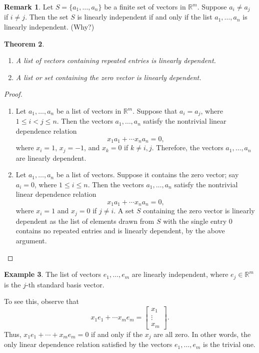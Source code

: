 \documentclass{amsart}
\newcommand{\RR}{\mathbb{R}}
\newtheorem{theorem}{Theorem}[section]
\theoremstyle{definition}
\newtheorem{remark}[theorem]{Remark}
\newtheorem{example}[theorem]{Example}
\begin{document}
\begin{remark}
Let $S=\{a_1,\ldots,a_n\}$ be a finite set of vectors in $\RR^m$.
Suppose $a_i\neq a_j$ if $i\neq j$.
Then the set $S$ is linearly independent if and only if the list $a_1,\ldots,a_n$ is linearly independent. (Why?)
\end{remark}

\begin{theorem}\hfill
\begin{enumerate}
  \item A list of vectors containing repeated entries is linearly dependent.
  \item A list or set containing the zero vector is linearly dependent.
\end{enumerate}
\end{theorem}

\begin{proof}\hfill
\begin{enumerate}
  \item Let $a_1,\ldots,a_n$ be a list of vectors in $\RR^m$.
  Suppose that $a_i=a_j$, where $1\leq i<j\leq n$.
  Then the vectors $a_1,\ldots,a_n$ satisfy the nontrivial linear dependence relation
  \[
  x_1a_1+\cdots x_na_n=0,
  \]
  where $x_i=1$, $x_j=-1$, and $x_k=0$ if $k\neq i,j$.
  Therefore, the vectors $a_1,\ldots,a_n$ are linearly dependent.

  \item Let $a_1,\ldots,a_n$ be a list of vectors.
  Suppose it contains the zero vector; say $a_i=0$, where $1\leq i\leq n$. 
  Then the vectors $a_1,\ldots,a_n$ satisfy the nontrivial linear dependence relation
  \[
  x_1a_1+\cdots x_na_n=0,
  \]
  where $x_i=1$ and $x_j=0$ if $j\neq i$.
  A set $S$ containing the zero vector is linearly dependent as the list of elements drawn from $S$ with the single entry $0$ contains no repeated entries and is linearly dependent, by the above argument.
\end{enumerate}
\end{proof}

\begin{example}
The list of vectors $e_1,\ldots,e_m$ are linearly independent, where $e_j\in \RR^m$ is the $j$-th standard basis vector.

To see this, observe that
\[
x_1e_1+\cdots x_me_m = \begin{bmatrix}x_1\\\vdots\\x_m\end{bmatrix}.
\]
Thus, $x_1e_1+\cdots + x_me_m=0$ if and only if the $x_j$ are all zero.
In other words, the only linear dependence relation satisfied by the vectors $e_1,\ldots,e_m$ is the trivial one.
\end{example}
\end{document}
